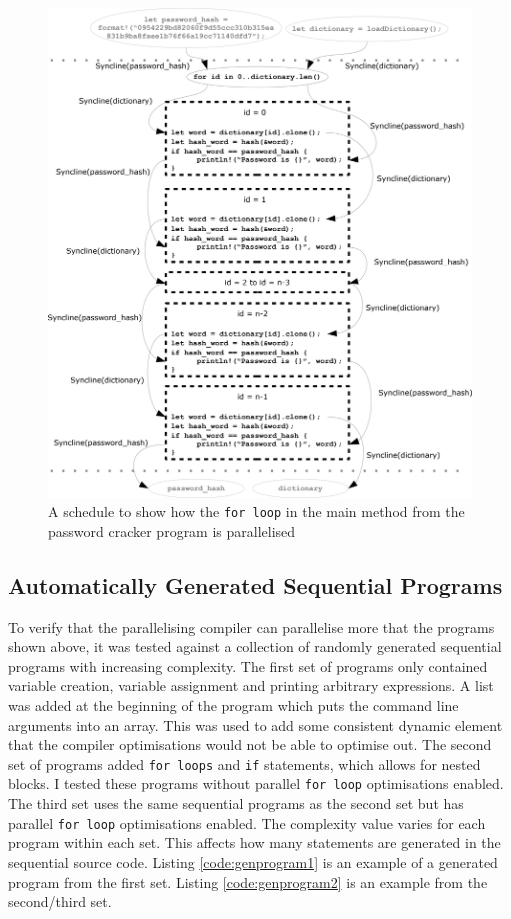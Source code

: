 \begin{figure}[H]
    \centering
    \includegraphics[width=\textwidth]{img/password-cracker/parallel-for.png}
    \caption{\label{fig:pass-for-sch}A schedule to show how the \texttt{for loop} in the main method from the password cracker program is parallelised}
\end{figure}

\subsection{Automatically Generated Sequential Programs}
To verify that the parallelising compiler can parallelise more that the programs shown above, it was tested against a collection of randomly generated sequential programs with increasing complexity. The first set of programs only contained variable creation, variable assignment and printing arbitrary expressions. A list was added at the beginning of the program which puts the command line arguments into an array. This was used to add some consistent dynamic element that the compiler optimisations would not be able to optimise out. The second set of programs added \texttt{for loops} and \texttt{if} statements, which allows for nested blocks. I tested these programs without parallel \texttt{for loop} optimisations enabled. The third set uses the same sequential programs as the second set but has parallel \texttt{for loop} optimisations enabled. The complexity value varies for each program within each set. This affects how many statements are generated in the sequential source code. Listing \autoref{code:genprogram1} is an example of a generated program from the first set. Listing \autoref{code:genprogram2} is an example from the second/third set.


